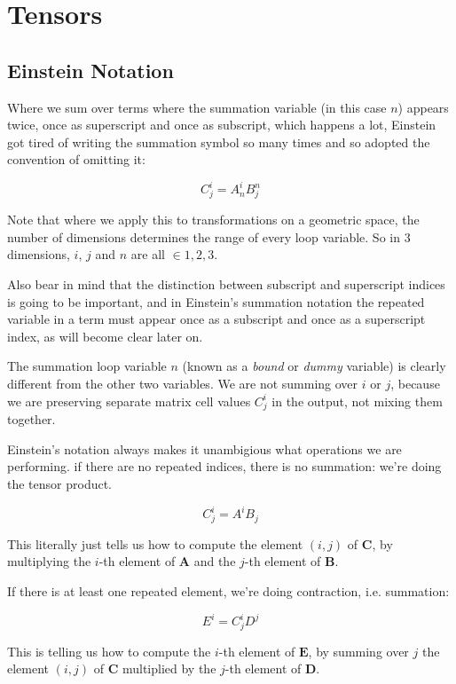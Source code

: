 \chapter{Tensors}

\section{Einstein Notation}

Where we sum over terms where the summation variable (in this case $n$) appears twice, once as superscript and once as subscript, which happens a lot, Einstein got tired of writing the summation symbol so many times and so adopted the convention of omitting it:

$$C^i_j = A^i_nB^n_j$$

Note that where we apply this to transformations on a geometric space, the number of dimensions determines the range of every loop variable. So in 3 dimensions, $i$, $j$ and $n$ are all $\in {1, 2, 3}$.

Also bear in mind that the distinction between subscript and superscript indices is going to be important, and in Einstein's summation notation the repeated variable in a term must appear once as a subscript and once as a superscript index, as will become clear later on.

The summation loop variable $n$ (known as a \textit{bound} or \textit{dummy} variable) is clearly different from the other two variables. We are not summing over $i$ or $j$, because we are preserving separate matrix cell values $C^i_j$ in the output, not mixing them together.

Einstein's notation always makes it unambigious what operations we are performing. if there are no repeated indices, there is no summation: we're doing the tensor product.

$$C^i_j = A^iB_{j}$$

This literally just tells us how to compute the element $(i, j)$ of $\boldsymbol{C}$, by multiplying the $i$-th element of $\boldsymbol{A}$ and the $j$-th element of $\boldsymbol{B}$.

If there is at least one repeated element, we're doing contraction, i.e. summation:

$$E^i = C^i_jD^j$$

This is telling us how to compute the $i$-th element of $\boldsymbol{E}$, by summing over $j$ the element $(i, j)$ of $\boldsymbol{C}$ multiplied by the $j$-th element of $\boldsymbol{D}$.

